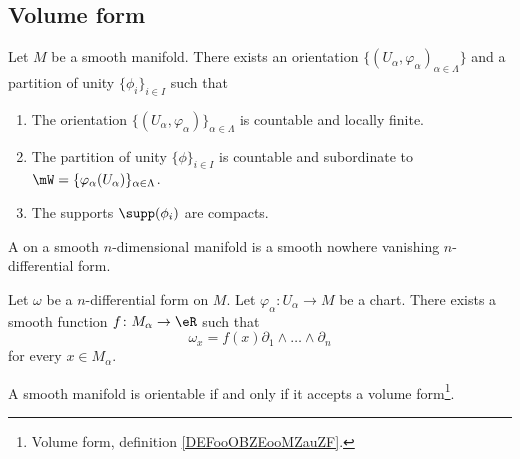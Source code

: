 \subsection{Volume form}

\begin{proposition}		\label{PROPooBIVHooXOycnS}
	Let \( M\) be a smooth manifold. There exists an orientation \( \{ (U_{\alpha},\varphi_{\alpha})_{\alpha\in \Lambda} \}\) and a partition of unity \( \{ \phi_i \}_{i\in I}\) such that
	\begin{enumerate}
		\item
		      The orientation \( \{ (U_{\alpha},\varphi_{\alpha}) \}_{\alpha\in \Lambda}\) is countable and locally finite.
		\item
		      The partition of unity \( \{ \phi \}_{i\in I}\)  is countable and subordinate to \( \mW=\{ \varphi_{\alpha}(U_{\alpha}) \}_{\alpha\in \Lambda}\).
		\item
		      The supports \( \supp(\phi_i)\) are compacts.
	\end{enumerate}
\end{proposition}



\begin{definition}			\label{DEFooOBZEooMZauZF}
	A  on a smooth \(n \)-dimensional manifold is a smooth nowhere vanishing \( n\)-differential form.
\end{definition}

\begin{lemma}		\label{LEMooQGVMooSHXUmD}
	Let \( \omega\) be a \( n\)-differential form on \( M\). Let \(\varphi_{\alpha} \colon U_{\alpha} \to M  \) be a chart. There exists a smooth function \(f \colon M_{\alpha}\to \eR   \) such that
	\begin{equation}
		\omega_x=f(x)\partial_1\wedge\ldots\wedge\partial_n
	\end{equation}
	for every \( x\in M_{\alpha}\).
\end{lemma}

\begin{theorem}	\label{THOooQEFUooQTtPDD}
	A smooth manifold is orientable if and only if it accepts a volume form\footnote{Volume form, definition \ref{DEFooOBZEooMZauZF}.}.
\end{theorem}

